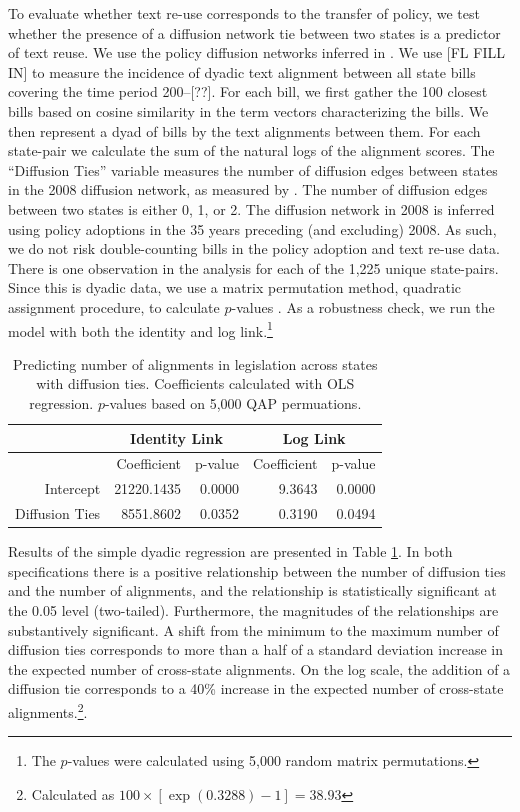 \documentclass[12pt]{article} %
\begin{document}
To evaluate whether text re-use corresponds to the transfer of policy, we test whether the presence of a diffusion network tie between two states is a predictor of text reuse. We use the policy diffusion networks inferred in \citet{desmarais2015}. We use [FL FILL IN] to measure the incidence of dyadic text alignment between all state bills covering the time period 200--[??]. For each bill, we first gather the 100 closest bills based on cosine similarity in the term vectors characterizing the bills. We then represent a dyad of bills by the text alignments between them. For each state-pair we calculate the sum of the natural logs of the alignment scores. The ``Diffusion Ties'' variable measures the number of diffusion edges between states in the 2008 diffusion network, as measured by \citet{desmarais2015}. The number of diffusion edges between two states is either 0, 1, or 2. The diffusion network in 2008 is inferred using policy adoptions in the 35 years preceding (and excluding) 2008. As such, we do not risk double-counting bills in the policy adoption and text re-use data. There is one observation in the analysis for each of the 1,225 unique state-pairs. Since this is dyadic data, we use a matrix permutation method, quadratic assignment procedure, to calculate $p$-values \citep{krackhardt1988}. As a robustness check, we run the model with both the identity and log link.\footnote{The $p$-values were calculated using 5,000 random matrix permutations.}

\begin{table}[ht]
\centering
\begin{tabular}{rrrrr}
\hline
& \multicolumn{2}{c}{Identity Link} & \multicolumn{2}{c}{Log Link} \\
  \hline
 & Coefficient & p-value & Coefficient & p-value \\ 
  \hline
Intercept & 21220.1435 & 0.0000 & 9.3643 & 0.0000 \\ 
  Diffusion Ties & 8551.8602 & 0.0352 & 0.3190 & 0.0494 \\ 
   \hline
\end{tabular}
\caption{Predicting number of alignments in legislation across states with diffusion ties. Coefficients calculated with OLS regression. $p$-values based on 5,000 QAP permuations.}
\label{tab:qap.diffusion}
\end{table}

Results of the simple dyadic regression are presented in Table \ref{tab:qap.diffusion}. In both specifications there is a positive relationship between the number of diffusion ties and the number of alignments, and the relationship is statistically significant at the 0.05 level (two-tailed). Furthermore, the magnitudes of the relationships are substantively significant. A shift from the minimum to the maximum number of diffusion ties corresponds to more than a half of a standard deviation increase in the expected number of cross-state alignments. On the log scale, the addition of a diffusion tie corresponds to a 40\% increase in the expected number of cross-state alignments.\footnote{Calculated as $100\times \left[ \exp(0.3288)-1\right] = 38.93$}. 
\end{document}
